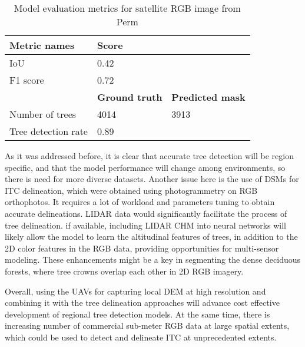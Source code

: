 \begin{table}[h]
\caption{Model evaluation metrics for satellite RGB image from Perm}
\label{Res3}
\vskip 0.15in
\begin{center}
\begin{small}
\begin{sc}
\begin{tabular}{lp{4cm}p{4cm}}
\hline
\textbf{Metric names} & \textbf{Score} & \\\hline
\gls{IoU} &0.42  & \\
F1 score &0.72  & \\\hline
&\textbf{Ground truth}  & \textbf{Predicted mask}\\\hline
Number of trees &4014  & 3913\\
Tree detection rate &0.89  & \\\hline
\end{tabular}
\end{sc}
\end{small}
\end{center}
\vskip -0.1in
\end{table}

As it was addressed before, it is clear that accurate tree detection will be region specific, and that the model performance will change among environments, so there is need for more diverse datasets.
Another issue here is the use of \gls{DSM}s for \gls{ITC} delineation, which were obtained using photogrammetry on RGB orthophotos. It requires a lot of workload and parameters tuning to obtain accurate delineations. \gls{LIDAR} data would significantly facilitate the process of tree delineation.
if available, including \gls{LIDAR} \gls{CHM} into neural networks will likely allow the model to learn the altitudinal features of trees, in addition to the 2D color features in the RGB data, providing opportunities for multi-sensor modeling. These enhancements might be a key in segmenting the dense deciduous forests, where tree crowns overlap each other in 2D RGB imagery. 

Overall, using the \gls{UAV}s for capturing local \gls{DEM} at high resolution and combining it with the tree delineation approaches will advance cost effective development of regional tree detection models. At the same time, there is increasing number of commercial sub-meter RGB data at large spatial extents, which could be used to detect and delineate \gls{ITC} at unprecedented extents.
